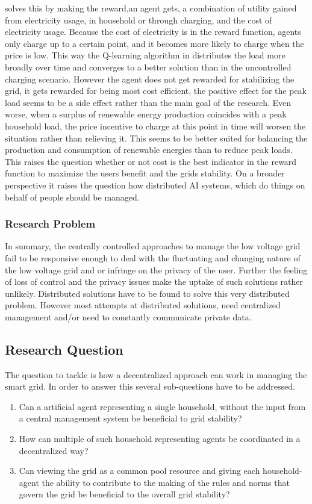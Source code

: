 \documentclass[a4paper]{article}
\begin{document}
\cite{reinforce_money} solves this by making the reward,an agent gets, a combination of
utility gained from electricity usage, in household or through charging, and the cost of electricity usage.  Because the cost of
electricity is in the reward
function, agents only charge up to a certain point, and it becomes more likely to charge when the price is low. This way the 
Q-learning algorithm in \cite{reinforce_money} distributes
the load more broadly over time and converges to a better solution than in the uncontrolled charging scenario. However the agent does 
not get rewarded for stabilizing the grid, it gets
rewarded for being most cost efficient, the positive effect for the peak load seems to be a side effect rather than the main goal of 
the research.  Even worse, when a surplus of renewable energy production coincides with a peak household load, the price incentive to 
charge at this point in time will worsen the situation rather than relieving it. This seems to be better suited for balancing the 
production and consumption of renewable energies than to reduce peak loads.
This raises the question whether or not cost is the best indicator in the 
reward function to maximize the users benefit and the grids stability. On a broader perspective it raises the question how distributed
AI systems, which do things on behalf of people should be managed. \\ 
\subsubsection{Research Problem}
In summary, the centrally controlled approaches to manage the low voltage grid fail to be responsive enough to deal with the 
fluctuating and changing nature of the low voltage grid and or infringe on the privacy of the user. Further the feeling of 
loss of control and the privacy issues make the uptake of such solutions rather unlikely. Distributed solutions have to be found to solve 
this very distributed problem. However most attempts at distributed solutions, need centralized management and/or need to constantly 
communicate private data.



\subsection{Research Question}
The question to tackle is how a decentralized approach can work in managing the smart grid. In order to answer this several 
sub-questions have to be addressed. 
\begin{enumerate}
\item Can a artificial agent representing a single household, without the input from a central management system be beneficial to grid stability?
\item How can multiple of  such household representing agents be coordinated in a decentralized way?
\item Can viewing the grid as a common pool resource and giving each household-agent the ability to contribute to the making of the rules and norms that govern the grid be beneficial to the overall grid stability? 
\end{enumerate}
\end{document}
